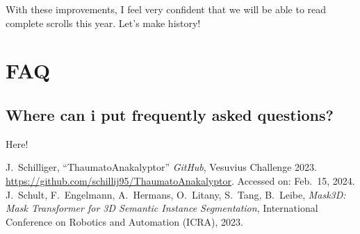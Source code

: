 \documentclass[peerreview]{IEEEtran}
\begin{document}
With these improvements, I feel very confident that we will be able to read complete scrolls this year. Let's make history!


\appendices
\section{FAQ} \label{App:FAQ}
\subsection{Where can i put frequently asked questions?}
Here!

\begin{thebibliography}{1}
J.~Schilliger, ``ThaumatoAnakalyptor'' \emph{GitHub}, Vesuvius Challenge 2023. \url{https://github.com/schillij95/ThaumatoAnakalyptor}. Accessed on: Feb.~15, 2024.
J.~Schult, F.~Engelmann, A.~Hermans, O.~Litany, S.~Tang, B.~Leibe, \emph{Mask3D: Mask Transformer for 3D Semantic Instance Segmentation}, International Conference on Robotics and Automation (ICRA), 2023.


\end{thebibliography}

\end{document}

